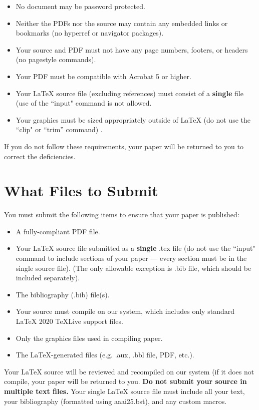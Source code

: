 \documentclass[letterpaper]{article} %
\begin{document}
\begin{itemize}
\item No document may be password protected.
\item Neither the PDFs nor the source may contain any embedded links or bookmarks (no hyperref or navigator packages).
\item Your source and PDF must not have any page numbers, footers, or headers (no pagestyle commands).
\item Your PDF must be compatible with Acrobat 5 or higher.
\item Your \LaTeX{} source file (excluding references) must consist of a \textbf{single} file (use of the ``input" command is not allowed.
\item Your graphics must be sized appropriately outside of \LaTeX{} (do not use the ``clip" or ``trim'' command) .
\end{itemize}

If you do not follow these requirements, your paper will be returned to you to correct the deficiencies.

\section{What Files to Submit}
You must submit the following items to ensure that your paper is published:
\begin{itemize}
\item A fully-compliant PDF file.
\item Your \LaTeX{} source file submitted as a \textbf{single} .tex file (do not use the ``input" command to include sections of your paper --- every section must be in the single source file). (The only allowable exception is .bib file, which should be included separately).
\item The bibliography (.bib) file(s).
\item Your source must compile on our system, which includes only standard \LaTeX{} 2020 TeXLive support files.
\item Only the graphics files used in compiling paper.
\item The \LaTeX{}-generated files (e.g. .aux,  .bbl file, PDF, etc.).
\end{itemize}

Your \LaTeX{} source will be reviewed and recompiled on our system (if it does not compile, your paper will be returned to you. \textbf{Do not submit your source in multiple text files.} Your single \LaTeX{} source file must include all your text, your bibliography (formatted using aaai25.bst), and any custom macros.
\end{document}
